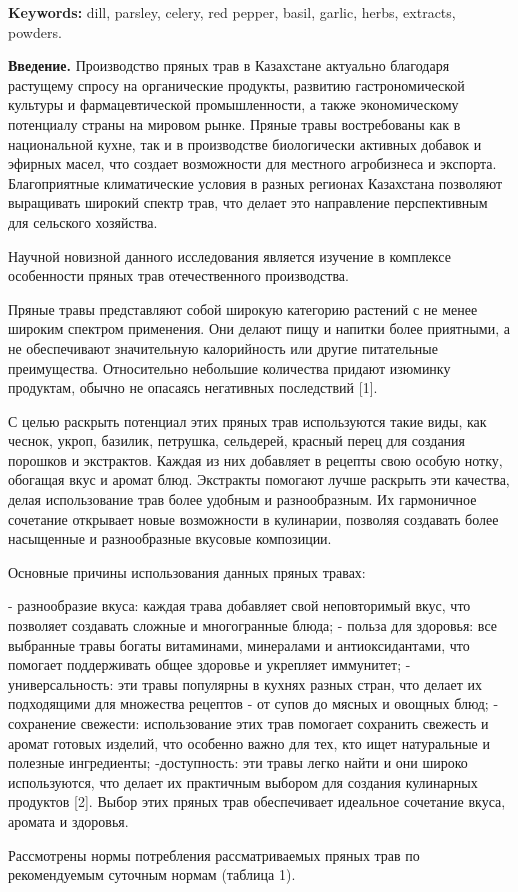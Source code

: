 {\bfseries Keywords:} dill, parsley, celery, red pepper, basil, garlic,
herbs, extracts, powders.

\begin{multicols}{2}
{\bfseries Введение.} Производство пряных трав в Казахстане актуально
благодаря растущему спросу на органические продукты, развитию
гастрономической культуры и фармацевтической промышленности, а также
экономическому потенциалу страны на мировом рынке. Пряные травы
востребованы как в национальной кухне, так и в производстве биологически
активных добавок и эфирных масел, что создает возможности для местного
агробизнеса и экспорта. Благоприятные климатические условия в разных
регионах Казахстана позволяют выращивать широкий спектр трав, что делает
это направление перспективным для сельского хозяйства.

Научной новизной данного исследования является изучение в комплексе
особенности пряных трав отечественного производства.

Пряные травы представляют собой широкую категорию растений с не менее
широким спектром применения. Они делают пищу и напитки более приятными,
а не обеспечивают значительную калорийность или другие питательные
преимущества. Относительно небольшие количества придают изюминку
продуктам, обычно не опасаясь негативных последствий {[}1{]}.

С целью раскрыть потенциал этих пряных трав используются такие виды, как
чеснок, укроп, базилик, петрушка, сельдерей, красный перец для создания
порошков и экстрактов. Каждая из них добавляет в рецепты свою особую
нотку, обогащая вкус и аромат блюд. Экстракты помогают лучше раскрыть
эти качества, делая использование трав более удобным и разнообразным. Их
гармоничное сочетание открывает новые возможности в кулинарии, позволяя
создавать более насыщенные и разнообразные вкусовые композиции.

Основные причины использования данных пряных травах:

- разнообразие вкуса: каждая трава добавляет свой неповторимый вкус, что
позволяет создавать сложные и многогранные блюда; - польза для здоровья:
все выбранные травы богаты витаминами, минералами и антиоксидантами, что
помогает поддерживать общее здоровье и укрепляет иммунитет; -
универсальность: эти травы популярны в кухнях разных стран, что делает
их подходящими для множества рецептов - от супов до мясных и овощных
блюд; - сохранение свежести: использование этих трав помогает сохранить
свежесть и аромат готовых изделий, что особенно важно для тех, кто ищет
натуральные и полезные ингредиенты; -доступность: эти травы легко найти
и они широко используются, что делает их практичным выбором для создания
кулинарных продуктов {[}2{]}. Выбор этих пряных трав обеспечивает
идеальное сочетание вкуса, аромата и здоровья.

Рассмотрены нормы потребления рассматриваемых пряных трав по
рекомендуемым суточным нормам (таблица 1).
\end{multicols}

